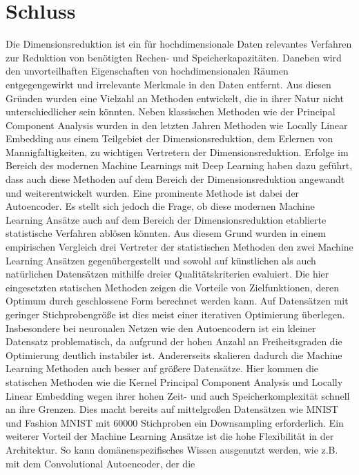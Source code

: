 \chapter{Schluss}
\label{ch:Schluss}

Die Dimensionsreduktion ist ein für hochdimensionale Daten relevantes Verfahren zur Reduktion von
benötigten Rechen- und Speicherkapazitäten. Daneben wird den unvorteilhaften Eigenschaften von
hochdimensionalen Räumen entgegengewirkt und irrelevante Merkmale in den Daten entfernt. Aus diesen
Gründen wurden eine Vielzahl an Methoden entwickelt, die in ihrer Natur nicht unterschiedlicher
sein könnten. Neben klassischen Methoden wie der Principal Component Analysis wurden in den letzten
Jahren Methoden wie Locally Linear Embedding aus einem Teilgebiet der Dimensionsreduktion, dem
Erlernen von Mannigfaltigkeiten, zu wichtigen Vertretern der Dimensionsreduktion. Erfolge im
Bereich des modernen Machine Learnings mit Deep Learning haben dazu geführt, dass auch diese
Methoden auf dem Bereich der Dimensionsreduktion angewandt und weiterentwickelt wurden. Eine
prominente Methode ist dabei der Autoencoder. Es stellt sich jedoch die Frage, ob diese modernen
Machine Learning Ansätze auch auf dem Bereich der Dimensionsreduktion etablierte statistische
Verfahren ablösen könnten. Aus diesem Grund wurden in einem empirischen Vergleich drei Vertreter
der statistischen Methoden den zwei Machine Learning Ansätzen gegenübergestellt und sowohl auf
künstlichen als auch natürlichen Datensätzen mithilfe dreier Qualitätskriterien evaluiert. Die hier
eingesetzten statischen Methoden zeigen die Vorteile von Zielfunktionen, deren Optimum durch
geschlossene Form berechnet werden kann. Auf Datensätzen mit geringer Stichprobengröße ist dies
meist einer iterativen Optimierung überlegen. Insbesondere bei neuronalen Netzen wie den
Autoencodern ist ein kleiner Datensatz problematisch, da aufgrund der hohen Anzahl an
Freiheitsgraden die Optimierung deutlich instabiler ist. Andererseits skalieren dadurch die Machine
Learning Methoden auch besser auf größere Datensätze. Hier kommen die statischen Methoden wie die
Kernel Principal Component Analysis und Locally Linear Embedding wegen ihrer hohen Zeit- und auch
Speicherkomplexität schnell an ihre Grenzen. Dies macht bereits auf mittelgroßen Datensätzen wie
MNIST und Fashion MNIST mit \num{60000} Stichproben ein Downsampling erforderlich. Ein weiterer
Vorteil der Machine Learning Ansätze ist die hohe Flexibilität in der Architektur. So kann
domänenspezifisches Wissen ausgenutzt werden, wie z.B. mit dem Convolutional Autoencoder, der die
